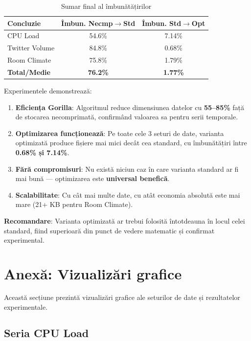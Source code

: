 \begin{table}[h]
\centering
\begin{tabular}{@{}lcc@{}}
\toprule
\textbf{Concluzie} & \textbf{Îmbun. Necmp$\rightarrow$Std} & \textbf{Îmbun. Std$\rightarrow$Opt} \\
\midrule
CPU Load & 54.6\% & 7.14\% \\
Twitter Volume & 84.8\% & 0.68\% \\
Room Climate & 75.8\% & 1.79\% \\
\midrule
\textbf{Total/Medie} & \textbf{76.2\%} & \textbf{1.77\%} \\
\bottomrule
\end{tabular}
\caption{Sumar final al îmbunătățirilor}
\label{tab:final-summary}
\end{table}

Experimentele demonstrează:

\begin{enumerate}
    \item \textbf{Eficiența Gorilla}: Algoritmul reduce dimensiunea datelor cu \textbf{55--85\%} față de stocarea necomprimată, confirmând valoarea sa pentru serii temporale.

    \item \textbf{Optimizarea funcționează}: Pe toate cele 3 seturi de date, varianta optimizată produce fișiere mai mici decât cea standard, cu îmbunătățiri între \textbf{0.68\% și 7.14\%}.

    \item \textbf{Fără compromisuri}: Nu există niciun caz în care varianta standard ar fi mai bună --- optimizarea este \textbf{universal benefică}.

    \item \textbf{Scalabilitate}: Cu cât mai multe date, cu atât economia absolută este mai mare (21+ KB pentru Room Climate).
\end{enumerate}

\textbf{Recomandare}: Varianta optimizată ar trebui folosită întotdeauna în locul celei standard, fiind superioară din punct de vedere matematic și confirmat experimental.

\section{Anexă: Vizualizări grafice}

Această secțiune prezintă vizualizări grafice ale seturilor de date și rezultatelor experimentale.

\subsection{Seria CPU Load}

